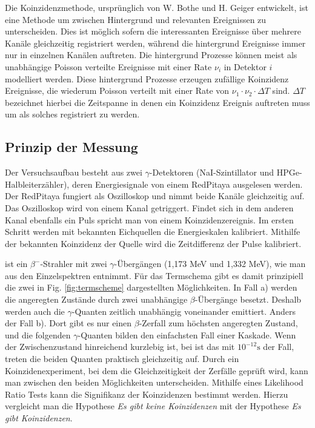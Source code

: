 Die Koinzidenzmethode, ursprünglich von W. Bothe und H. Geiger entwickelt, ist eine Methode um zwischen Hintergrund und relevanten Ereignissen zu unterscheiden. Dies ist möglich sofern die interessanten Ereignisse über mehrere Kanäle gleichzeitig registriert werden, während die hintergrund Ereignisse immer nur in einzelnen Kanälen auftreten.
Die hintergrund Prozesse können meist als unabhängige Poisson verteilte Ereignisse mit einer Rate $\nu_i$ in Detektor $i$ modelliert werden. Diese hintergrund Prozesse erzeugen zufällige Koinzidenz Ereignisse, die wiederum Poisson verteilt mit einer Rate von $\nu_1\cdot\nu_2\cdot\Delta T$ sind. $\Delta T$ bezeichnet hierbei die Zeitspanne in denen ein Koinzidenz Ereignis auftreten muss um als solches registriert zu werden.

\subsection{Prinzip der Messung}
Der Versuchsaufbau besteht aus zwei $\gamma$-Detektoren (NaI-Szintillator und HPGe-Halbleiterzähler), deren Energiesignale von einem RedPitaya ausgelesen werden. Der RedPitaya fungiert als Oszilloskop und nimmt beide Kanäle gleichzeitig auf. Das Oszilloskop wird von einem Kanal getriggert. Findet sich in dem anderen Kanal ebenfalls ein Puls spricht man von einem Koinzidenzereignis.
Im ersten Schritt werden mit bekannten Eichquellen die Energieskalen kalibriert. Mithilfe der bekannten Koinzidenz der  Quelle wird die Zeitdifferenz der Pulse kalibriert.

 ist ein $\beta^{-}$-Strahler mit zwei $\gamma$-Übergängen (1,173 MeV und 1,332 MeV), wie man aus den Einzelspektren entnimmt. Für das Termschema gibt es damit prinzipiell die zwei in Fig. \ref{fig:termscheme} dargestellten Möglichkeiten. In Fall a) werden die angeregten Zustände durch zwei unabhängige $\beta$-Übergänge besetzt. Deshalb werden auch die $\gamma$-Quanten zeitlich unabhängig voneinander emittiert. Anders der Fall b). Dort gibt es nur einen $\beta$-Zerfall zum höchsten angeregten Zustand, und die folgenden $\gamma$-Quanten bilden den einfachsten Fall einer Kaskade. Wenn der Zwischenzustand hinreichend kurzlebig ist, bei  ist das mit $10^{-12}\mathrm{s}$ der Fall, treten die beiden Quanten praktisch gleichzeitig auf. Durch ein Koinzidenexperiment, bei dem die Gleichzeitigkeit der Zerfälle geprüft wird, kann man zwischen den beiden Möglichkeiten unterscheiden. Mithilfe eines Likelihood Ratio Tests kann die Signifikanz der Koinzidenzen bestimmt werden. Hierzu vergleicht man die Hypothese \emph{Es gibt keine Koinzidenzen} mit der Hypothese \emph{Es gibt Koinzidenzen}.


